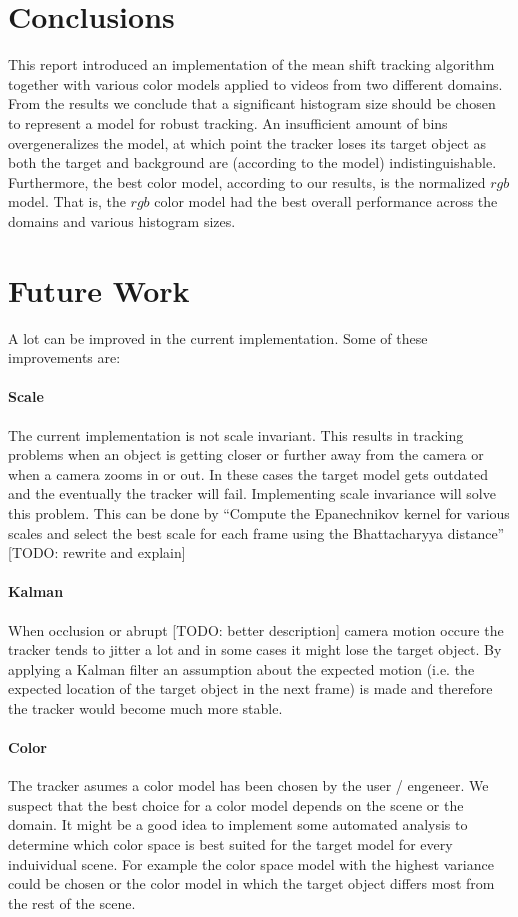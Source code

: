 \documentclass[11pt]{article}
\begin{document}
\section{Conclusions} \label{sec:conclusion}
This report introduced an implementation of the mean shift tracking algorithm
together with various color models applied to videos from two different domains.
From the results we conclude that a significant histogram size should be chosen
to represent a model for robust tracking. An insufficient amount of bins
overgeneralizes the model, at which point the tracker loses its target object as
both the target and background are (according to the model) indistinguishable.
Furthermore, the best color model, according to our results, is the normalized
$rgb$ model. That is, the $rgb$ color model had the best overall performance
across the domains and various histogram sizes.

\section{Future Work} \label{sec:future}
A lot can be improved in the current implementation. Some of these improvements
are:
\paragraph{Scale} The current implementation is not scale invariant. This
results in tracking problems when an object is getting closer or further away
from the camera or when a camera zooms in or out. In these cases the target
model gets outdated and the eventually the tracker will fail. Implementing
scale invariance will solve this problem. This can be done by ``Compute the
Epanechnikov kernel for various scales and select the best scale for each
frame using the Bhattacharyya distance'' [TODO: rewrite and explain]

\paragraph{Kalman} When occlusion or abrupt [TODO: better description] camera
motion occure the tracker tends to jitter a lot and in some cases it might lose
the target object. By applying a Kalman filter an assumption about the expected
motion (i.e. the expected location of the target object in the next frame) is made
and therefore the tracker would become much more stable.

\paragraph{Color} The tracker asumes a color model has been chosen by the user /
engeneer. We suspect that the best choice for a color model depends on the scene
or the domain. It might be a good idea to implement some automated analysis to
determine which color space is best suited for the target model for every
induividual scene. For example the color space model with the highest variance
could be chosen or the color model in which the target object differs most from
the rest of the scene.
\end{document}
